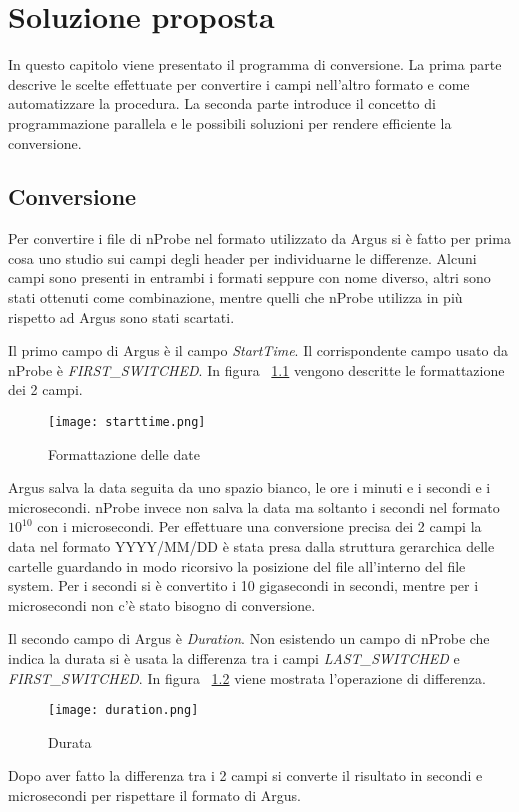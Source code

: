 \documentclass[../main.tex]{subfiles}
\begin{document}
\chapter{Soluzione proposta}

In questo capitolo viene presentato il programma di conversione. La prima parte descrive le scelte effettuate per convertire i campi nell'altro formato e come automatizzare la procedura. La seconda parte introduce il concetto di programmazione parallela e le possibili soluzioni per rendere efficiente la conversione.


\section{Conversione}
Per convertire i file di nProbe nel formato utilizzato da Argus si è fatto per prima cosa uno studio sui campi degli header per individuarne le differenze. Alcuni campi sono presenti in entrambi i formati seppure con nome diverso, altri sono stati ottenuti come combinazione, mentre quelli che nProbe utilizza in più rispetto ad Argus sono stati scartati. 

Il primo campo di Argus è il campo \textit{StartTime}. Il corrispondente campo usato da nProbe è \textit{FIRST\_SWITCHED}. In figura ~\ref{fig:starttime} vengono descritte le formattazione dei 2 campi.
\begin{figure}[H]
				\centering
\texttt{[image: starttime.png]}
				\caption{Formattazione delle date}
				\label{fig:starttime}
\end{figure}
Argus salva la data seguita da uno spazio bianco, le ore i minuti e i secondi e i microsecondi. nProbe invece non salva la data ma soltanto i secondi nel formato $10^{10}$ con i microsecondi. Per effettuare una conversione precisa dei 2 campi la data nel formato YYYY/MM/DD è stata presa dalla struttura gerarchica delle cartelle guardando in modo ricorsivo la posizione del file all'interno del file system. Per i secondi si è convertito i 10 gigasecondi in secondi, mentre per i microsecondi non c'è stato bisogno di conversione.

Il secondo campo di Argus è \textit{Duration}. Non esistendo un campo di nProbe che indica la durata si è usata la differenza tra i campi \textit{LAST\_SWITCHED} e \textit{FIRST\_SWITCHED}. In figura ~\ref{fig:duration} viene mostrata l'operazione di differenza.
\begin{figure}[H]
				\centering
\texttt{[image: duration.png]}
				\caption{Durata}
				\label{fig:duration}
\end{figure}
Dopo aver fatto la differenza tra i 2 campi si converte il risultato in secondi e microsecondi per rispettare il formato di Argus.
\end{document}
